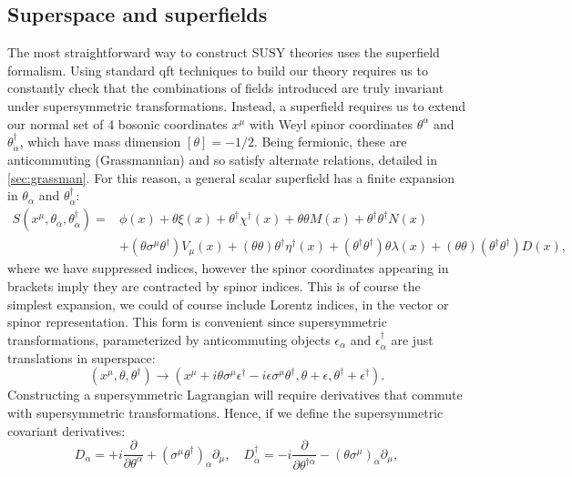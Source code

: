 \subsection{Superspace and superfields}
\label{subsec:superfield}
The most straightforward way to construct SUSY theories uses the superfield formalism. Using standard \acrshort{qft} techniques to build our theory requires us to constantly check that the combinations of fields introduced are truly invariant under supersymmetric transformations. Instead, a superfield requires us to extend our normal set of 4 bosonic coordinates $x^{\mu}$ with Weyl spinor coordinates $\theta^{\alpha}$ and $\theta^{\dagger}_{\dot{\alpha}}$, which have mass dimension $[\theta]=-1/2$. Being fermionic, these are anticommuting (Grassmannian) and so satisfy alternate relations, detailed in \ref{sec:grassman}.
For this reason, a general scalar superfield has a finite expansion in $\theta_{\alpha}$ and $\theta^{\dagger}_{\dot{\alpha}}$:
\begin{align}
S(x^{\mu},\theta_{\alpha},\theta^{\dagger}_{\dot{\alpha}}) = & \phi(x)+\theta\xi(x)+\theta^{\dagger}\chi^{\dagger}(x)+\theta\theta M(x) + \theta^{\dagger}\theta^{\dagger}N(x) \nonumber \\
& + (\theta \sigma^{\mu} \theta^{\dagger})V_{\mu}(x) 
+(\theta\theta)\theta^{\dagger}\eta^{\dagger}(x) + (\theta^{\dagger}\theta^{\dagger})\theta\lambda(x)+(\theta\theta)(\theta^{\dagger}\theta^{\dagger})D(x),
\label{eqn:gensup}
\end{align}
where we have suppressed indices, however the spinor coordinates appearing in brackets imply they are contracted by spinor indices. This is of course the simplest expansion, we could of course include Lorentz indices, in the vector or spinor representation. This form is convenient since supersymmetric transformations, parameterized by anticommuting objects $\epsilon_{\alpha}$ and $\epsilon^{\dagger}_{\dot{\alpha}}$ are just translations in superspace:
\begin{equation}
(x^{\mu},\theta,\theta^{\dagger})\rightarrow(x^{\mu}+i\theta\sigma^{\mu}\epsilon^{\dagger}-i\epsilon\sigma^{\mu}\theta^{\dagger},\theta+\epsilon,\theta^{\dagger}+\epsilon^{\dagger}).
\end{equation}
Constructing a supersymmetric Lagrangian will require derivatives that commute with supersymmetric transformations. Hence, if we define the supersymmetric covariant derivatives:
\begin{equation}
D_{\alpha} = +i\frac{\partial}{\partial \theta^{\alpha}}+(\sigma^{\mu}\theta^{\dagger})_{\alpha}\partial_{\mu},\quad D^{\dagger}_{\dot{\alpha}} = -i\frac{\partial}{\partial \theta^{\dagger \dot{\alpha}}}-(\theta \sigma^{\mu})_{\dot{\alpha}}\partial_{\mu},
\end{equation}
